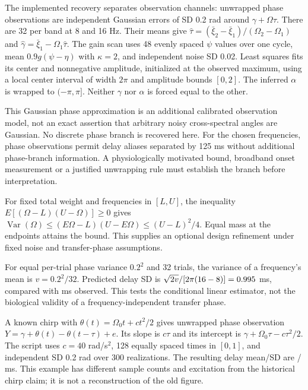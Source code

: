 \documentclass[11pt,a4paper]{article}
\begin{document}
The implemented recovery separates observation channels: unwrapped phase observations are independent Gaussian errors of SD 0.2 rad around $\gamma+\Omega\tau$. There are 32 per band at 8 and 16 Hz. Their means give $\widehat\tau=(\bar\xi_2-\bar\xi_1)/(\Omega_2-\Omega_1)$ and $\widehat\gamma=\bar\xi_1-\Omega_1\widehat\tau$. The gain scan uses 48 evenly spaced $\psi$ values over one cycle, mean $0.9g(\psi-\eta)$ with $\kappa=2$, and independent noise SD 0.02. Least squares fits its center and nonnegative amplitude, initialized at the observed maximum, using a local center interval of width $2\pi$ and amplitude bounds $[0,2]$. The inferred $\alpha$ is wrapped to $(-\pi,\pi]$. Neither $\gamma$ nor $\alpha$ is forced equal to the other.

This Gaussian phase approximation is an additional calibrated observation model, not an exact assertion that arbitrary noisy cross-spectral angles are Gaussian. No discrete phase branch is recovered here. For the chosen frequencies, phase observations permit delay aliases separated by 125 ms without additional phase-branch information. A physiologically motivated bound, broadband onset measurement or a justified unwrapping rule must establish the branch before interpretation.

For fixed total weight and frequencies in $[L,U]$, the inequality $E[(\Omega-L)(U-\Omega)]\ge0$ gives $\operatorname{Var}(\Omega)\le(E\Omega-L)(U-E\Omega)\le(U-L)^2/4$. Equal mass at the endpoints attains the bound. This supplies an optional design refinement under fixed noise and transfer-phase assumptions.

For equal per-trial phase variance $0.2^2$ and 32 trials, the variance of a frequency's mean is $v=0.2^2/32$. Predicted delay SD is $\sqrt{2v}/[2\pi(16-8)]=0.995{}$ ms, compared with \TauSD{} ms observed. This tests the conditional linear estimator, not the biological validity of a frequency-independent transfer phase.

A known chirp with $\theta(t)=\Omega_0t+ct^2/2$ gives unwrapped phase observation $Y=\gamma+\theta(t)-\theta(t-\tau)+e$. Its slope is $c\tau$ and its intercept is $\gamma+\Omega_0\tau-c\tau^2/2$. The script uses $c=40$ rad/s$^2$, 128 equally spaced times in $[0,1]$, and independent SD 0.2 rad over 300 realizations. The resulting delay mean/SD are \ChirpMean{}/\ChirpSD{} ms. This example has different sample counts and excitation from the historical chirp claim; it is not a reconstruction of the old figure.
\end{document}
